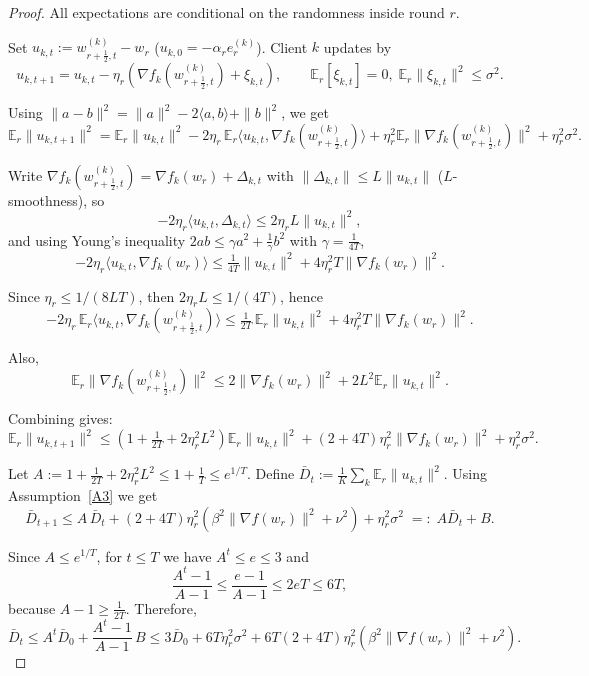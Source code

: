 \documentclass{article} %
\begin{document}
\begin{proof}
All expectations are conditional on the randomness inside round \(r\).

Set \(u_{k,t} := w_{r+\frac12,t}^{(k)} - w_r\) (\(u_{k,0} = -\alpha_r e_r^{(k)}\)).
Client \(k\) updates by
\[
u_{k,t+1} = u_{k,t} - \eta_r
          \left(\nabla f_k(w_{r+\frac12,t}^{(k)}) + \xi_{k,t}\right),
\qquad
\mathbb{E}_r[\xi_{k,t}] = 0,\;
\mathbb{E}_r\|\xi_{k,t}\|^{2} \le \sigma^{2}.
\]

Using \(\|a - b\|^{2} = \|a\|^{2} - 2\langle a, b\rangle + \|b\|^{2}\), we get
\[
\mathbb{E}_r\|u_{k,t+1}\|^{2}
= \mathbb{E}_r\|u_{k,t}\|^{2}
   - 2\eta_r\,\mathbb{E}_r\langle u_{k,t}, \nabla f_k(w_{r+\frac12,t}^{(k)})\rangle
   + \eta_r^{2}\mathbb{E}_r\|\nabla f_k(w_{r+\frac12,t}^{(k)})\|^{2}
   + \eta_r^{2}\sigma^{2}.
\]

Write \(\nabla f_k(w_{r+\frac12,t}^{(k)}) = \nabla f_k(w_r) + \Delta_{k,t}\)
with \(\|\Delta_{k,t}\| \le L\|u_{k,t}\|\) (\(L\)-smoothness), so
\[
-2\eta_r\langle u_{k,t}, \Delta_{k,t} \rangle
    \le 2\eta_r L\|u_{k,t}\|^{2},
\]
and using Young’s inequality \( 2ab \le \gamma a^2 + \frac{1}{\gamma}b^2 \) with $\gamma = \frac{1}{4T}$,
\[
-2\eta_r\langle u_{k,t}, \nabla f_k(w_r) \rangle
\le \tfrac{1}{4T}\|u_{k,t}\|^{2} + 4\eta_r^{2}T\|\nabla f_k(w_r)\|^{2}.
\]

Since \(\eta_r \le 1/(8LT)\), then \(2\eta_r L \le 1/(4T)\), hence
\[
-2\eta_r\,\mathbb{E}_r\langle u_{k,t}, \nabla f_k(w_{r+\frac12,t}^{(k)})\rangle
\le \tfrac{1}{2T}\,\mathbb{E}_r\|u_{k,t}\|^{2}
        + 4\eta_r^{2}T\|\nabla f_k(w_r)\|^{2}.
\]

Also,
\[
\mathbb{E}_r\|\nabla f_k(w_{r+\frac12,t}^{(k)})\|^{2}
\le 2\|\nabla f_k(w_r)\|^{2} + 2L^{2}\mathbb{E}_r\|u_{k,t}\|^{2}.
\]

Combining gives:
\[
\mathbb{E}_r\|u_{k,t+1}\|^{2}
\le \left(1 + \tfrac{1}{2T} + 2\eta_r^{2}L^{2}\right)\mathbb{E}_r\|u_{k,t}\|^{2}
+ (2 + 4T)\eta_r^{2}\|\nabla f_k(w_r)\|^{2}
+ \eta_r^{2}\sigma^{2}.
\]

Let \(A := 1 + \tfrac{1}{2T} + 2\eta_r^{2}L^{2} \le 1 + \tfrac{1}{T} \le e^{1/T}\).
Define \(\bar D_t := \frac{1}{K} \sum_k \mathbb{E}_r\|u_{k,t}\|^{2}\).
Using Assumption~\ref{A3} we get
\[
\bar D_{t+1}
\le A\,\bar D_t
+ (2 + 4T)\eta_r^{2}
  \left(\beta^{2}\|\nabla f(w_r)\|^{2} + \nu^{2} \right)
+ \eta_r^{2}\sigma^{2} \;=:\; A\bar D_t + B.
\]

Since \(A \le e^{1/T}\), for \(t\le T\) we have \(A^{t} \le e \le 3\) and
\[
\frac{A^{t}-1}{A-1} \le \frac{e-1}{A-1} \le 2eT \le 6T,
\]
because \(A-1 \ge \tfrac{1}{2T}\).
Therefore,
\[
\bar D_t
\le A^{t}\bar D_0 + \frac{A^{t}-1}{A-1}\,B
\le 3\bar D_0
+ 6T \eta_r^{2} \sigma^{2}
+ 6T (2 + 4T) \eta_r^{2}
  \left( \beta^{2} \|\nabla f(w_r)\|^{2} + \nu^{2} \right).
\]


\end{proof}
\end{document}
